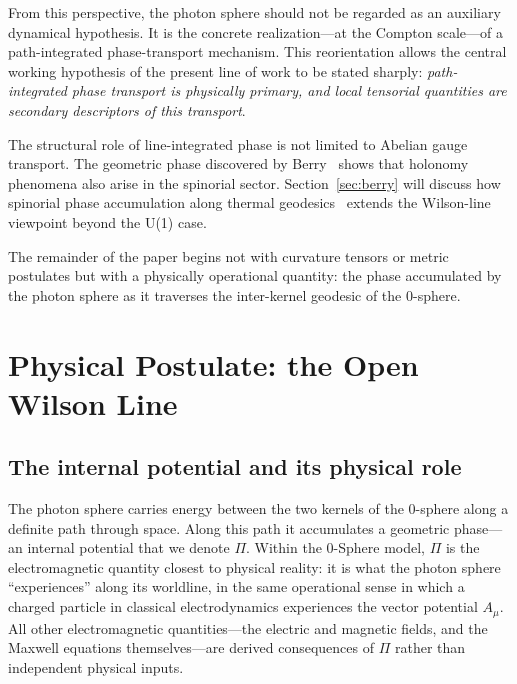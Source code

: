 \documentclass[%
 reprint, amsmath,amssymb, aps, prb, ]{revtex4-2}
\numberwithin{equation}{section}
\begin{document}
From this perspective, the photon sphere should not be regarded as an auxiliary dynamical hypothesis. It is the concrete realization---at the Compton scale---of a path-integrated phase-transport mechanism. This reorientation allows the central working hypothesis of the present line of work to be stated sharply: \emph{path-integrated phase transport is physically primary, and local tensorial quantities are secondary descriptors of this transport}.

The structural role of line-integrated phase is not limited to Abelian gauge transport. The geometric phase discovered by Berry~\cite{Berry1984} shows that holonomy phenomena also arise in the spinorial sector. Section~\ref{sec:berry} will discuss how spinorial phase accumulation along thermal geodesics~\cite{hanamura24,hanamura26} extends the Wilson-line viewpoint beyond the U(1) case.

The remainder of the paper begins not with curvature tensors or metric postulates but with a physically operational quantity: the phase accumulated by the photon sphere as it traverses the inter-kernel geodesic of the 0-sphere.

\section{Physical Postulate: the Open Wilson Line}
\label{sec:postulate}

\subsection{The internal potential and its physical role}

The photon sphere carries energy between the two kernels of the 0-sphere along a definite path through space. Along this path it accumulates a geometric phase---an internal potential that we denote $\Pi$. Within the 0-Sphere model, $\Pi$ is the electromagnetic quantity closest to physical reality: it is what the photon sphere ``experiences'' along its worldline, in the same operational sense in which a charged particle in classical electrodynamics experiences the vector potential $A_\mu$. All other electromagnetic quantities---the electric and magnetic fields, and the Maxwell equations themselves---are derived consequences of $\Pi$ rather than independent physical inputs.
\end{document}
